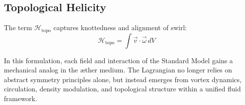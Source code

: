 \subsection{Topological Helicity}

The term $\mathcal{H}_\text{topo}$ captures knottedness and alignment of swirl:
\begin{equation}
\mathcal{H}_\text{topo} = \int \vec{v} \cdot \vec{\omega} \, dV
\end{equation}
\bigskip

In this formulation, each field and interaction of the Standard Model gains a mechanical analog in the æther medium. The Lagrangian no longer relies on abstract symmetry principles alone, but instead emerges from vortex dynamics, circulation, density modulation, and topological structure within a unified fluid framework.

